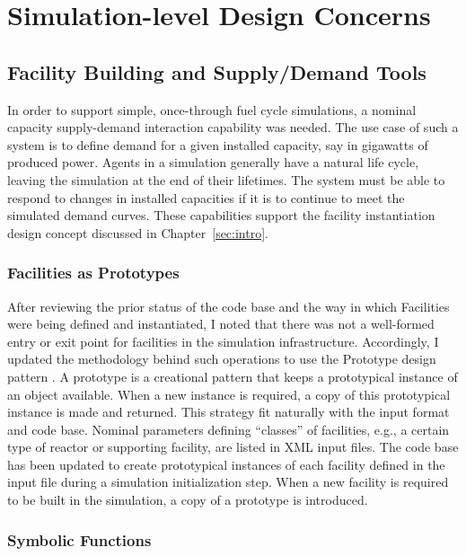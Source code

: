 \section{Simulation-level Design Concerns}

\subsection{Facility Building and Supply/Demand Tools}

In order to support simple, once-through fuel cycle simulations, a nominal
capacity supply-demand interaction capability was needed. The use case of such a
system is to define demand for a given installed capacity, say in gigawatts of
produced power. Agents in a \Cyclus simulation generally have a natural life
cycle, leaving the simulation at the end of their lifetimes. The system must be
able to respond to changes in installed capacities if it is to continue to meet
the simulated demand curves. These capabilities support the facility
instantiation design concept discussed in Chapter~\ref{sec:intro}.

\subsubsection{Facilities as Prototypes}
After reviewing the prior status of the code base and the way in which
Facilities were being defined and instantiated, I noted that there was not a
well-formed entry or exit point for facilities in the simulation
infrastructure. Accordingly, I updated the methodology behind such operations to
use the Prototype design pattern \cite{vlissides_design_1995}. A prototype is a
creational pattern that keeps a prototypical instance of an object
available. When a new instance is required, a copy of this prototypical instance
is made and returned. This strategy fit naturally with the \Cyclus input format
and code base. Nominal parameters defining ``classes'' of facilities, e.g., a
certain type of reactor or supporting facility, are listed in XML input
files. The code base has been updated to create prototypical instances of each
facility defined in the input file during a simulation initialization step. When
a new facility is required to be built in the simulation, a copy of a prototype
is introduced.

\subsubsection{Symbolic Functions}

